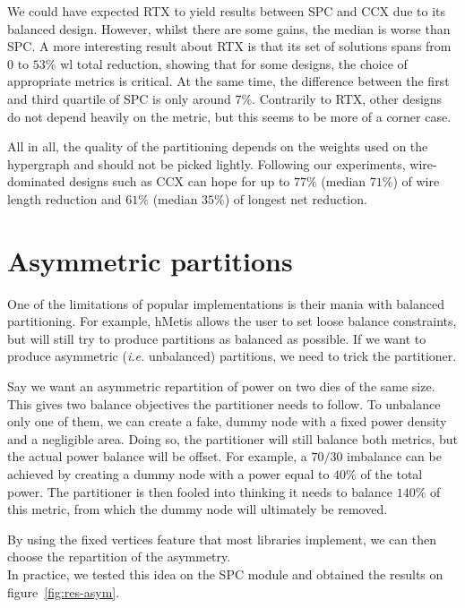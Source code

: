 \documentclass[11pt,a4paper]{report} %
\theoremstyle{customdef}
\begin{document}
We could have expected RTX to yield results between SPC and CCX due to its balanced design.
However, whilst there are some gains, the median is worse than SPC.
A more interesting result about RTX is that its set of solutions spans from $0$ to $53\%$ \gls{wl} total reduction, showing that for some designs, the choice of appropriate metrics is critical.
At the same time, the difference between the first and third quartile of SPC is only around $7\%$.
Contrarily to RTX, other designs do not depend heavily on the metric, but this seems to be more of a corner case.

All in all, the quality of the partitioning depends on the weights used on the hypergraph and should not be picked lightly.
Following our experiments, wire-dominated designs such as CCX can hope for up to $77\%$ (median $71\%$) of wire length reduction and $61\%$ (median $35\%$) of longest net reduction.




\section{Asymmetric partitions}\label{sec:asym-part}
One of the limitations of popular implementations is their mania with balanced partitioning.
For example, hMetis allows the user to set loose balance constraints, but will still try to produce partitions as balanced as possible.
If we want to produce asymmetric (\textit{i.e.} unbalanced) partitions, we need to trick the partitioner.

Say we want an asymmetric repartition of power on two dies of the same size.
This gives two balance objectives the partitioner needs to follow.
To unbalance only one of them, we can create a fake, dummy node with a fixed power density and a negligible area.
Doing so, the partitioner will still balance both metrics, but the actual power balance will be offset.
For example, a $70/30$ imbalance can be achieved by creating a dummy node with a power equal to $40\%$ of the total power.
The partitioner is then fooled into thinking it needs to balance $140\%$ of this metric, from which the dummy node will ultimately be removed.

By using the fixed vertices feature that most libraries implement, we can then choose the repartition of the asymmetry.\\

In practice, we tested this idea on the SPC module and obtained the results on figure~\ref{fig:res-asym}.
\end{document}
